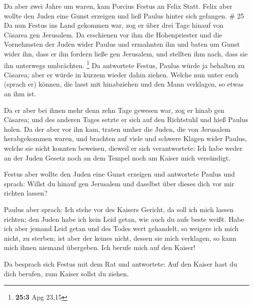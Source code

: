  Da aber zwei Jahre um waren, kam Porcius Festus an Felix
Statt. Felix aber wollte den Juden eine Gunst erzeigen und ließ Paulus
hinter sich gefangen. \# 25  Da nun Festus ins Land
gekommen war, zog er über drei Tage hinauf von Cäsarea gen Jerusalem.
 Da erschienen vor ihm die Hohenpriester und die
Vornehmsten der Juden wider Paulus und ermahnten ihn  und
baten um Gunst wider ihn, dass er ihn fordern ließe gen Jerusalem, und
stellten ihm nach, dass sie ihn unterwegs umbrächten. \footnote{\textbf{25:3}
  Apg 23,15}  Da antwortete Festus, Paulus würde ja
behalten zu Cäsarea; aber er würde in kurzem wieder dahin ziehen.
 Welche nun unter euch (sprach er) können, die lasst mit
hinabziehen und den Mann verklagen, so etwas an ihm ist.

 Da er aber bei ihnen mehr denn zehn Tage gewesen war, zog
er hinab gen Cäsarea; und des anderen Tages setzte er sich auf den
Richtstuhl und hieß Paulus holen.  Da der aber vor ihn
kam, traten umher die Juden, die von Jerusalem herabgekommen waren, und
brachten auf viele und schwere Klagen wider Paulus, welche sie nicht
konnten beweisen,  dieweil er sich verantwortete: Ich habe
weder an der Juden Gesetz noch an dem Tempel noch am Kaiser mich
versündigt.

 Festus aber wollte den Juden eine Gunst erzeigen und
antwortete Paulus und sprach: Willst du hinauf gen Jerusalem und
daselbst über dieses dich vor mir richten lassen?

 Paulus aber sprach: Ich stehe vor des Kaisers Gericht,
da soll ich mich lassen richten; den Juden habe ich kein Leid getan, wie
auch du aufs beste weißt.  Habe ich aber jemand Leid
getan und des Todes wert gehandelt, so weigere ich mich nicht, zu
sterben; ist aber der keines nicht, dessen sie mich verklagen, so kann
mich ihnen niemand übergeben. Ich berufe mich auf den Kaiser!

 Da besprach sich Festus mit dem Rat und antwortete: Auf
den Kaiser hast du dich berufen, zum Kaiser sollst du ziehen.

